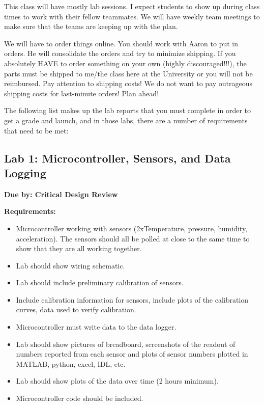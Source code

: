 \documentclass[11pt]{article}
\begin{document}
This class will have mostly lab sessions. I expect students to show up
during class times to work with their fellow teammates. We will have
weekly team meetings to make sure that the teams are keeping up with
the plan.

We will have to order things online. You should work with Aaron to put
in orders.  He will consolidate the orders and try to minimize
shipping. If you absolutely HAVE to order something on your own
(highly discouraged!!!), the parts must be shipped to me/the class
here at the University or you will not be reimbursed. Pay attention to
shipping costs! We do not want to pay outrageous shipping costs for
last-minute orders!  Plan ahead!

The following list makes up the lab reports that you must complete in
order to get a grade and launch, and in those labs, there are a number
of requirements that need to be met:

\subsection{Lab 1:  Microcontroller, Sensors, and Data Logging}

{\bf Due by: Critical Design Review}

\noindent
{\bf Requirements:}

\begin{itemize}
   \item Microcontroller working with sensors (2xTemperature,
     pressure, humidity, acceleration). The sensors should all be
     polled at close to the same time to show that they are all
     working together.
    \item Lab should show wiring schematic. 
    \item Lab should include preliminary calibration of sensors. 
    \item Include calibration information for sensors, include plots
      of the calibration curves, data used to verify calibration.
    \item Microcontroller must write data to the data logger.
    \item Lab should show pictures of breadboard, screenshots of the
      readout of numbers reported from each sensor and plots of sensor
      numbers plotted in MATLAB, python, excel, IDL, etc.
    \item Lab should show plots of the data over time (2 hours minimum).
    \item Microcontroller code should be included. 
\end{itemize}
\end{document}

